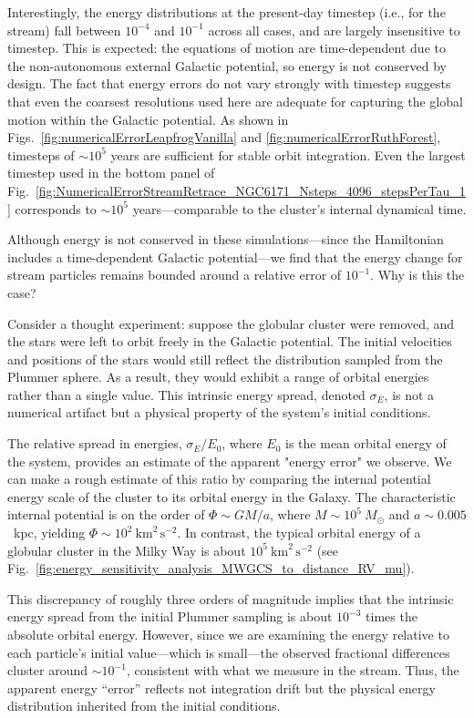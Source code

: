         Interestingly, the energy distributions at the present-day timestep (i.e., for the stream) fall between $10^{-4}$ and $10^{-1}$ across all cases, and are largely insensitive to timestep. This is expected: the equations of motion are time-dependent due to the non-autonomous external Galactic potential, so energy is not conserved by design. The fact that energy errors do not vary strongly with timestep suggests that even the coarsest resolutions used here are adequate for capturing the global motion within the Galactic potential. As shown in Figs.~\ref{fig:numericalErrorLeapfrogVanilla} and \ref{fig:numericalErrorRuthForest}, timesteps of $\sim10^5$ years are sufficient for stable orbit integration. Even the largest timestep used in the bottom panel of Fig.~\ref{fig:NumericalErrorStreamRetrace_NGC6171_Nsteps_4096_stepsPerTau_1} corresponds to $\sim10^5$ years—comparable to the cluster's internal dynamical time.

        Although energy is not conserved in these simulations—since the Hamiltonian includes a time-dependent Galactic potential—we find that the energy change for stream particles remains bounded around a relative error of $10^{-1}$. Why is this the case?

        Consider a thought experiment: suppose the globular cluster were removed, and the stars were left to orbit freely in the Galactic potential. The initial velocities and positions of the stars would still reflect the distribution sampled from the Plummer sphere. As a result, they would exhibit a range of orbital energies rather than a single value. This intrinsic energy spread, denoted $\sigma_E$, is not a numerical artifact but a physical property of the system's initial conditions.

        The relative spread in energies, $\sigma_E / E_0$, where $E_0$ is the mean orbital energy of the system, provides an estimate of the apparent "energy error" we observe. We can make a rough estimate of this ratio by comparing the internal potential energy scale of the cluster to its orbital energy in the Galaxy. The characteristic internal potential is on the order of $\Phi \sim GM/a$, where $M \sim 10^5~M_\odot$ and $a \sim 0.005$~kpc, yielding $\Phi \sim 10^2~\mathrm{km}^2\,\mathrm{s}^{-2}$. In contrast, the typical orbital energy of a globular cluster in the Milky Way is about $10^5~\mathrm{km}^2\,\mathrm{s}^{-2}$ (see Fig.~\ref{fig:energy_sensitivity_analysis_MWGCS_to_distance_RV_mu}). 

        This discrepancy of roughly three orders of magnitude implies that the intrinsic energy spread from the initial Plummer sampling is about $10^{-3}$ times the absolute orbital energy. However, since we are examining the energy relative to each particle's initial value—which is small—the observed fractional differences cluster around $\sim 10^{-1}$, consistent with what we measure in the stream. Thus, the apparent energy ``error'' reflects not integration drift but the physical energy distribution inherited from the initial conditions.


